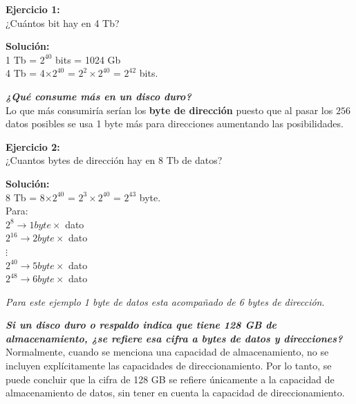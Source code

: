 \documentclass{templateNote}
\begin{document}
\begin{tcolorbox}[colback=green!5!white,colframe=green!75!black,title=Ejercicio]
    \textbf{Ejercicio 1:} \\
    ¿Cuántos bit hay en 4 Tb? \\
    \begin{center}
        \textbf{Solución:} \\
        1 Tb = $2^{40}$ bits = 1024 Gb\\
        4 Tb = 4$\times2^{40}$ = $2^{2}\times2^{40}$ = $2^{42}$ bits.

    \end{center}
\end{tcolorbox}

\noindent \textit{\textbf{¿Qué consume más en un disco duro?}}\\
Lo que más consumiría serían los \textbf{byte de dirección} puesto que al pasar los $256$ datos posibles se usa 1 byte más para direcciones aumentando las posibilidades. 

\begin{tcolorbox}[colback=green!5!white,colframe=green!75!black,title=Ejercicio]
    \textbf{Ejercicio 2:} \\
    ¿Cuantos bytes de dirección hay en 8 Tb de datos? \\
    \begin{center}
        \textbf{Solución:} \\
        8 Tb = 8$\times2^{40}$ = $2^{3}\times2^{40}$ = $2^{43}$ byte.\\
        Para: \\
        $2^{8}\rightarrow 1 $\space$byte \times$ dato \\
        $2^{16}\rightarrow 2 $\space$byte \times$ dato \\
        $\vdots$ \\
        $2^{40}\rightarrow 5 $\space$byte \times$ dato \\
        $2^{48}\rightarrow 6 $\space$byte \times$ dato \\
    \end{center}
    \textit{Para este ejemplo 1 byte de datos esta acompañado de 6 bytes de dirección}.
\end{tcolorbox}

\noindent \textbf{\textit{Si un disco duro o respaldo indica que tiene 128 GB de almacenamiento, ¿se refiere esa cifra a bytes de datos y direcciones?}} \\
Normalmente, cuando se menciona una capacidad de almacenamiento, no se incluyen explícitamente las capacidades de direccionamiento. Por lo tanto, se puede concluir 
que la cifra de 128 GB se refiere únicamente a la capacidad de almacenamiento de datos, sin tener en cuenta la capacidad de direccionamiento.
\end{document}
